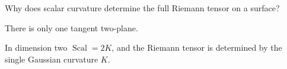 \begin{exercise}\label{exr:vii27-ped-16}
Why does scalar curvature determine the full Riemann tensor on a surface?
\end{exercise}

\begin{hint}
There is only one tangent two-plane.
\end{hint}

\begin{solution}
In dimension two \(\operatorname{Scal}=2K\), and the Riemann tensor is determined by the single Gaussian curvature \(K\).
\end{solution}

